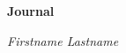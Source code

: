 \thispagestyle{empty} %
\begin{center}
	\vfill
    \vspace*{0.4\textheight}

	\Huge
	\bf{Journal}
    
	\Large
	\it{Firstname Lastname}

    \normalsize
\end{center}
\newpage